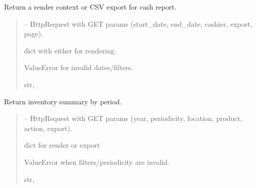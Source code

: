 \documentclass[a4paper,11pt,spanish]{sphinxmanual}
\begin{document}

\begin{fulllineitems}
\label{\detokenize{api/reports/reports.services:reports.services.get_cash_report_result}}
\pysigstartsignatures
\pysiglinewithargsret
{}
{}
{}
\pysigstopsignatures
\sphinxAtStartPar
Return a render context or CSV export for cash report.
\begin{quote}\begin{description}
\sphinxAtStartPar
{} – HttpRequest with GET params (start\_date, end\_date, cashier, export, page).

\sphinxAtStartPar
dict with either  for rendering.

\sphinxAtStartPar
ValueError for invalid dates/filters.

\sphinxAtStartPar
\sphinxstyleemphasis{Dict}{[}str, \sphinxstyleemphasis{Any}{]}

\end{description}\end{quote}

\end{fulllineitems}


\begin{fulllineitems}
\label{\detokenize{api/reports/reports.services:reports.services.get_inventory_report_result}}
\pysigstartsignatures
\pysiglinewithargsret
{}
{}
{}
\pysigstopsignatures
\sphinxAtStartPar
Return inventory summary by period.
\begin{quote}\begin{description}
\sphinxAtStartPar
{} – HttpRequest with GET params (year, periodicity, location, product, action, export).

\sphinxAtStartPar
dict for render or export

\sphinxAtStartPar
ValueError when filters/periodicity are invalid.

\sphinxAtStartPar
\sphinxstyleemphasis{Dict}{[}str, \sphinxstyleemphasis{Any}{]}

\end{description}\end{quote}

\end{fulllineitems}
\end{document}

